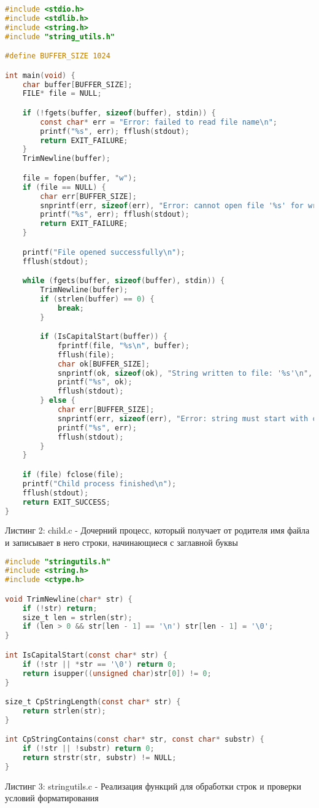 \begin{lstlisting}[language=C]
#include <stdio.h>
#include <stdlib.h>
#include <string.h>
#include "string_utils.h"

#define BUFFER_SIZE 1024

int main(void) {
    char buffer[BUFFER_SIZE];
    FILE* file = NULL;

    if (!fgets(buffer, sizeof(buffer), stdin)) {
        const char* err = "Error: failed to read file name\n";
        printf("%s", err); fflush(stdout);
        return EXIT_FAILURE;
    }
    TrimNewline(buffer);

    file = fopen(buffer, "w");
    if (file == NULL) {
        char err[BUFFER_SIZE];
        snprintf(err, sizeof(err), "Error: cannot open file '%s' for writing\n", buffer);
        printf("%s", err); fflush(stdout);
        return EXIT_FAILURE;
    }

    printf("File opened successfully\n");
    fflush(stdout);

    while (fgets(buffer, sizeof(buffer), stdin)) {
        TrimNewline(buffer);
        if (strlen(buffer) == 0) {
            break;
        }

        if (IsCapitalStart(buffer)) {
            fprintf(file, "%s\n", buffer);
            fflush(file);
            char ok[BUFFER_SIZE];
            snprintf(ok, sizeof(ok), "String written to file: '%s'\n", buffer);
            printf("%s", ok);
            fflush(stdout);
        } else {
            char err[BUFFER_SIZE];
            snprintf(err, sizeof(err), "Error: string must start with capital letter - '%s'\n", buffer);
            printf("%s", err);
            fflush(stdout);
        }
    }

    if (file) fclose(file);
    printf("Child process finished\n");
    fflush(stdout);
    return EXIT_SUCCESS;
}
\end{lstlisting}
Листинг 2: child.c - Дочерний процесс, который получает от родителя имя файла и записывает в него строки, начинающиеся с заглавной буквы

\begin{lstlisting}[language=C]
#include "stringutils.h"
#include <string.h>
#include <ctype.h>

void TrimNewline(char* str) {
    if (!str) return;
    size_t len = strlen(str);
    if (len > 0 && str[len - 1] == '\n') str[len - 1] = '\0';
}

int IsCapitalStart(const char* str) {
    if (!str || *str == '\0') return 0;
    return isupper((unsigned char)str[0]) != 0;
}

size_t CpStringLength(const char* str) {
    return strlen(str);
}

int CpStringContains(const char* str, const char* substr) {
    if (!str || !substr) return 0;
    return strstr(str, substr) != NULL;
}
\end{lstlisting}
Листинг 3: stringutils.c - Реализация функций для обработки строк и проверки условий форматирования


